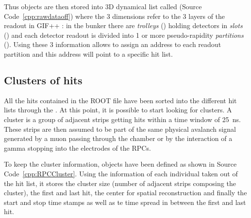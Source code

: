     Thus  objects are then stored into 3D dynamical list called  (Source Code~\ref{cpp:rawdataoff}) where the 3 dimensions refer to the 3 layers of the readout in GIF++ : in the bunker there are \textit{trolleys} () holding detectors in \textit{slots} () and each detector readout is divided into 1 or more pseudo-rapidity \textit{partitions} (). Using these 3 information allows to assign an address to each readout partition and this address will point to a specific hit list.\\
	
	\subsection{Clusters of hits}
	\label{app2:ssec:RPCCluster}
	
	All the hits contained in the ROOT file have been sorted into the different hit lists through the . At this point, it is possible to start looking for clusters. A cluster is a group of adjacent strips getting hits within a time window of \SI{25}{ns}. These strips are then assumed to be part of the same physical avalanch signal generated by a muon passing through the chamber or by the interaction of a gamma stopping into the electrodes of the RPCs.
	
	To keep the cluster information,  objects have been defined as shown in Source Code~\ref{cpp:RPCCluster}. Using the information of each individual  taken out of the hit list, it stores the cluster size (number of adjacent strips composing the cluster), the first and last hit, the center for spatial reconstruction and finally the start and stop time stamps as well as te time spread in between the first and last hit.\\
	
